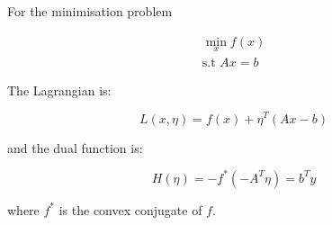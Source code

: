 \begin{example}
For the minimisation problem 

\begin{eqnarray}
\min_x f\left(x\right) \\
\text{s.t } Ax = b
\end{eqnarray}

The Lagrangian is:

\begin{equation}
L\left(x, \eta\right) = f\left(x\right) + \eta^T\left(Ax - b\right)
\end{equation}

and the dual function is:

\begin{equation}
H\left(\eta\right) = -f^*\left(-A^T\eta\right) = b^Ty
\end{equation}

where \(f^*\) is the convex conjugate of \(f\).

\end{example}




